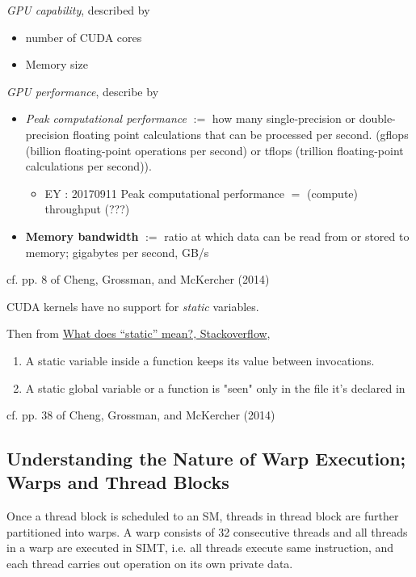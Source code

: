 \documentclass[10pt]{amsart}
\begin{document}
\begin{multicols*}{2}
\emph{GPU capability}, described by 
\begin{itemize}
	\item number of CUDA cores  
	\item Memory size
\end{itemize}

\emph{GPU performance}, describe by 
\begin{itemize}
	\item \emph{Peak computational performance} $:=$ how many single-precision or double-precision floating point calculations that can be processed per second.  (gflops (billion floating-point operations per second) or tflops (trillion floating-point calculations per second)).  
	\begin{itemize}
		\item EY : 20170911 Peak computational performance $=$ (compute) throughput (???)
	\end{itemize}
	\item \textbf{Memory bandwidth} $:=$ ratio at which data can be read from or stored to memory; gigabytes per second, GB/s
\end{itemize}
cf. pp. 8 of Cheng, Grossman, and McKercher (2014) \cite{CGM2014}

CUDA kernels have no support for \emph{static} variables.  

Then from \href{https://stackoverflow.com/questions/572547/what-does-static-mean}{What does “static” mean?, Stackoverflow}, 

\begin{enumerate}
	\item A static variable inside a function keeps its value between invocations. 
	\item A static global variable or a function is "seen" only in the file it's declared in
\end{enumerate}



cf. pp. 38 of Cheng, Grossman, and McKercher (2014) \cite{CGM2014}



\subsection{Understanding the Nature of Warp Execution; Warps and Thread Blocks}  

Once a thread block is scheduled to an SM, threads in thread block are further partitioned into warps.  A warp consists of 32 consecutive threads and all threads in a warp are executed in SIMT, i.e. all threads execute same instruction, and each thread carries out operation on its own private data.  


\end{multicols*}
\end{document}
